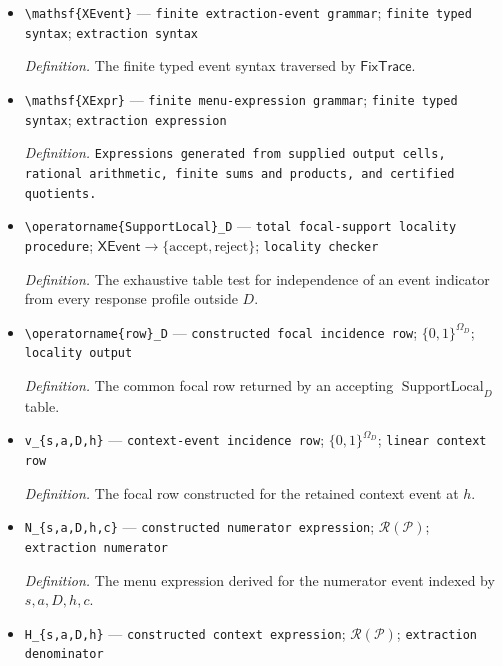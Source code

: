 \documentclass{article}
\begin{document}
\begin{itemize}
  \item \texttt{\textbackslash{}\allowbreak{}mathsf\{XEvent\}\allowbreak{}} --- \texttt{finite extraction-\allowbreak{}event grammar}; \texttt{finite typed syntax}; \texttt{extraction syntax}
  \par\smallskip\noindent\emph{Definition.} The finite typed event syntax traversed by \(\mathsf{FixTrace}\).
  \item \texttt{\textbackslash{}\allowbreak{}mathsf\{XExpr\}\allowbreak{}} --- \texttt{finite menu-\allowbreak{}expression grammar}; \texttt{finite typed syntax}; \texttt{extraction expression}
  \par\smallskip\noindent\emph{Definition.} \texttt{Expressions generated from supplied output cells,\allowbreak{} rational arithmetic,\allowbreak{} finite sums and products,\allowbreak{} and certified quotients.}
  \item \texttt{\textbackslash{}\allowbreak{}operatorname\{SupportLocal\}\allowbreak{}\_\allowbreak{}D} --- \texttt{total focal-\allowbreak{}support locality procedure}; \(\mathsf{XEvent}\to\{\mathrm{accept},\mathrm{reject}\}\); \texttt{locality checker}
  \par\smallskip\noindent\emph{Definition.} The exhaustive table test for independence of an event indicator from every response profile outside \(D\).
  \item \texttt{\textbackslash{}\allowbreak{}operatorname\{row\}\allowbreak{}\_\allowbreak{}D} --- \texttt{constructed focal incidence row}; \(\{0,1\}^{\Omega_D}\); \texttt{locality output}
  \par\smallskip\noindent\emph{Definition.} The common focal row returned by an accepting \(\operatorname{SupportLocal}_D\) table.
  \item \texttt{v\_\allowbreak{}\{s,\allowbreak{}a,\allowbreak{}D,\allowbreak{}h\}\allowbreak{}} --- \texttt{context-\allowbreak{}event incidence row}; \(\{0,1\}^{\Omega_D}\); \texttt{linear context row}
  \par\smallskip\noindent\emph{Definition.} The focal row constructed for the retained context event at \(h\).
  \item \texttt{N\_\allowbreak{}\{s,\allowbreak{}a,\allowbreak{}D,\allowbreak{}h,\allowbreak{}c\}\allowbreak{}} --- \texttt{constructed numerator expression}; \(\mathscr R(\mathcal P)\); \texttt{extraction numerator}
  \par\smallskip\noindent\emph{Definition.} The menu expression derived for the numerator event indexed by \(s,a,D,h,c\).
  \item \texttt{H\_\allowbreak{}\{s,\allowbreak{}a,\allowbreak{}D,\allowbreak{}h\}\allowbreak{}} --- \texttt{constructed context expression}; \(\mathscr R(\mathcal P)\); \texttt{extraction denominator}

\end{itemize}
\end{document}
